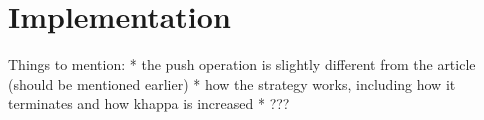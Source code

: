 \section{Implementation}
Things to mention:
* the push operation is slightly different from the article (should be mentioned earlier)
* how the strategy works, including how it terminates and how khappa is increased
* ???
